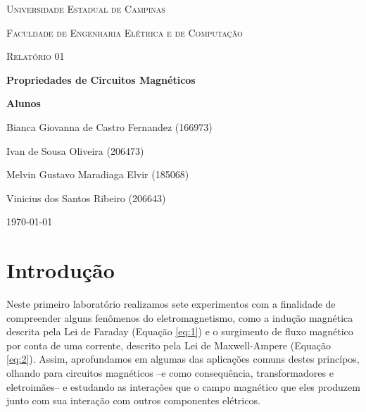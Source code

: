 \documentclass[12pt, a4paper, notitlepage]{article}
\begin{document}
        
    \def\figscale{0.8} 
    
    
    \begin{titlepage}
        \centering
    
        {\LARGE \textsc{Universidade Estadual de Campinas}\par}
        {\Large \textsc{Faculdade de Engenharia Elétrica e de Computação}\par}
        \vspace{1cm}
        {\Large \textsc{Relatório 01}\par}
        \vspace{1.5cm}
        {\huge\bfseries Propriedades de Circuitos Magnéticos\par}
        \vspace{2cm}
        \textbf{Alunos}\par
        Bianca Giovanna de Castro Fernandez (166973) \par\par
        Ivan de Sousa Oliveira (206473) \par\par
        Melvin Gustavo Maradiaga Elvir (185068) \par\par
        Vinicius dos Santos Ribeiro (206643) \par
        \vfill
        {\large \today\par}
    \end{titlepage}
    
    \newpage
        \noindent
        \section{Introdução}
        \hspace{0.5cm} Neste primeiro laboratório realizamos sete experimentos com a finalidade de compreender alguns fenômenos do eletromagnetismo, como a indução magnética descrita pela Lei de Faraday (Equação \ref{eq:1}) e o surgimento de fluxo magnético por conta de uma corrente, descrito pela Lei de Maxwell-Ampere (Equação \ref{eq:2}). Assim, aprofundamos em algumas das aplicações comuns destes princípos, olhando para circuitos magnéticos --e como consequência, transformadores e eletroimães-- e estudando as interações que o campo magnético que eles produzem junto com sua interação com outros componentes elétricos.
        
\end{document}

